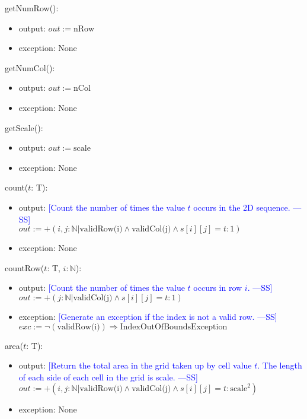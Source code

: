 \documentclass[12pt]{article}
\newcommand{\authornote}[3]{\textcolor{#1}{[#3 ---#2]}}
\newcommand{\authornote}[3]{}
\newcommand{\wss}[1]{\authornote{blue}{SS}{#1}}
\begin{document}
\noindent getNumRow():
\begin{itemize}
\item output: $out := \mbox{nRow}$
\item exception: None
\end{itemize}

\noindent getNumCol():
\begin{itemize}
\item output: $out := \mbox{nCol}$
\item exception: None
\end{itemize}

\noindent getScale():
\begin{itemize}
\item output: $out := \mbox{scale}$
\item exception: None
\end{itemize}

\noindent count($t$: T):
\begin{itemize}
\item output: \wss{Count the number of times the value $t$ occurs in the 2D
    sequence.} \\
$out := +(i,j : \mathbb{N} | \mbox{validRow(i)} \land \mbox{validCol(j)} \land s[i][j] = t : 1)$
\item exception: None
\end{itemize}

\noindent countRow($t$: T, $i: \mathbb{N}$):
\begin{itemize}
\item output: \wss{Count the number of times the value $t$ occurs in row
    $i$.} \\
$out := +(j : \mathbb{N} | \mbox{validCol(j)} \land s[i][j] = t : 1)$
\item exception: \wss{Generate an exception if the index is not a valid
    row.} \\
$exc := \lnot (\mbox{validRow(i)}) \Rightarrow \mbox{IndexOutOfBoundsException}$
\end{itemize}

\noindent area($t$: T):
\begin{itemize}
\item output: \wss{Return the total area in the grid taken up by cell value $t$.
    The length of each side of each cell in the grid is
    scale.} \\
$out := +(i,j : \mathbb{N} | \mbox{validRow(i)} \land \mbox{validCol(j)} \land s[i][j] = t : \mbox{scale}^2)$
\item exception: None
\end{itemize}
\end{document}
